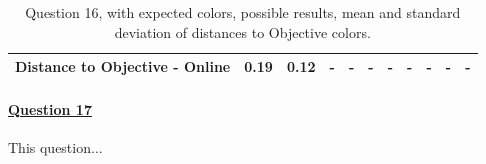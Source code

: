 \begin{table}[H]
{\begin{tabular}{lccccccccccccc}
    \multicolumn{4}{l}{Distance to Objective - Online}                                                                                               & \multicolumn{1}{|c}{0.19}        & \multicolumn{1}{c|}{0.12}    & \multicolumn{1}{|c}{-}        & \multicolumn{1}{c|}{-}    & \multicolumn{1}{|c}{-}       & \multicolumn{1}{c|}{-}    & \multicolumn{1}{|c}{-}        & \multicolumn{1}{c|}{-}    & \multicolumn{1}{|c}{-}       & \multicolumn{1}{c|}{-}    \\ \hline
    \end{tabular}}
  \caption[Question 16, with expected Results.]{Question 16, with expected colors, possible results, mean and standard deviation of distances to Objective colors.}
  \label{table:lab_q16_expected}
\end{table}
%
\paragraph{\ul{Question 17}}
%
This question...
%
